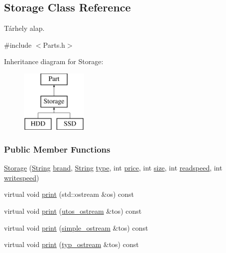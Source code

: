 \subsection{Storage Class Reference}
\label{class_storage}


Tárhely alap.  




{\ttfamily \#include $<$Parts.\+h$>$}

Inheritance diagram for Storage\+:\begin{figure}[H]
\begin{center}
\leavevmode
\includegraphics[height=3.000000cm]{class_storage}
\end{center}
\end{figure}
\subsubsection*{Public Member Functions}
\begin{DoxyCompactItemize}
\item 
\mbox{\hyperlink{class_storage_a502a2ec76e09d48a87da6ed1b91cdaa8}{Storage}} (\mbox{\hyperlink{class_string}{String}} \mbox{\hyperlink{class_part_ae06f2fdeb7fbbdb229a7aca151f3e341}{brand}}, \mbox{\hyperlink{class_string}{String}} \mbox{\hyperlink{class_part_a101dbcc5c4b21564df7414c7eb0eae88}{type}}, int \mbox{\hyperlink{class_part_a8e71223aed1da95a974f33d8d6c91bb1}{price}}, int \mbox{\hyperlink{class_storage_abcc80ce58a21fa884035617ee0b6cb67}{size}}, int \mbox{\hyperlink{class_storage_a41073842ff16961dad3903e6dd49bb0c}{readspeed}}, int \mbox{\hyperlink{class_storage_a0198a1483ccf849d48c76da88599ba8b}{writespeed}})
\item 
virtual void \mbox{\hyperlink{class_storage_aa9f6ffb0fd45839b54bd4e254270445d}{print}} (std\+::ostream \&os) const
\item 
virtual void \mbox{\hyperlink{class_storage_ab7ecf9e0777891b4e1a84bbf391a1cd4}{print}} (\mbox{\hyperlink{structutos__ostream}{utos\+\_\+ostream}} \&tos) const
\item 
virtual void \mbox{\hyperlink{class_storage_a53fc5b4814df41517b9f2be8dcef605e}{print}} (\mbox{\hyperlink{structsimple__ostream}{simple\+\_\+ostream}} \&tos) const
\item 
virtual void \mbox{\hyperlink{class_storage_ad6c13f251a39612a7628980bf2f12918}{print}} (\mbox{\hyperlink{structtyp__ostream}{typ\+\_\+ostream}} \&tos) const
\end{DoxyCompactItemize}
